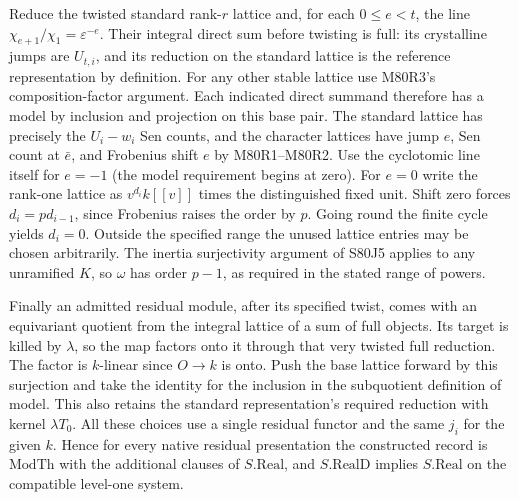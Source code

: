 Reduce the twisted standard rank-$r$ lattice and, for each $0\le e<t$,
the line $\chi_{e+1}/\chi_1=\varepsilon^{-e}$. Their integral direct
sum before twisting is full: its crystalline jumps are $U_{t,i}$,
and its reduction on the standard lattice is the reference
representation by definition. For any other stable lattice use
M80R3's composition-factor argument. Each indicated direct summand
therefore has a model by inclusion and projection on this base pair.
The standard lattice has precisely the $U_i-w_i$ Sen counts, and
the character lattices have jump $e$, Sen count at $\bar e$, and
Frobenius shift $e$ by M80R1--M80R2. Use the cyclotomic line itself
for $e=-1$ (the model requirement begins at zero). For $e=0$ write
the rank-one lattice as $v^{d_i}k[[v]]$ times the distinguished
fixed unit. Shift zero forces $d_i=p d_{i-1}$, since Frobenius
raises the order by $p$. Going round the finite cycle yields
$d_i=0$. Outside the specified range the unused lattice entries
may be chosen arbitrarily. The inertia surjectivity argument of
S80J5 applies to any unramified $K$, so $\omega$ has order $p-1$,
as required in the stated range of powers.

Finally an admitted residual module, after its specified twist,
comes with an equivariant quotient from the integral lattice of a
sum of full objects. Its target is killed by $\lambda$, so the map
factors onto it through that very twisted full reduction. The
factor is $k$-linear since $O\to k$ is onto. Push the base lattice
forward by this surjection and take the identity for the inclusion
in the subquotient definition of model. This also retains the
standard representation's required reduction with kernel $\lambda T_0$.
All these choices use a single residual functor and the same $j_i$
for the given $k$. Hence for every native residual presentation the
constructed record is $\mathrm{ModTh}$ with the additional clauses of
$S.\mathrm{Real}$, and $S.\mathrm{RealD}$ implies $S.\mathrm{Real}$
on the compatible level-one system.
